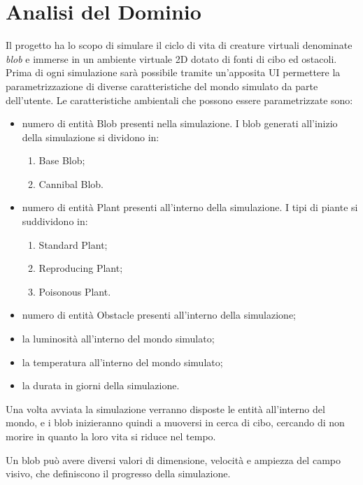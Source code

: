 \chapter{Analisi del Dominio}

Il progetto ha lo scopo di simulare il ciclo di vita di creature virtuali denominate \textit{blob} e immerse in un ambiente virtuale 2D dotato di fonti di cibo ed ostacoli.
Prima di ogni simulazione sarà possibile tramite un'apposita UI permettere la parametrizzazione di diverse caratteristiche del mondo simulato da parte dell'utente.
Le caratteristiche ambientali che possono essere parametrizzate sono:
\begin{itemize}
    \item numero di entità Blob presenti nella simulazione. I blob generati all'inizio della simulazione si dividono in:
    \begin{enumerate}
        \item Base Blob;
        \item Cannibal Blob.
    \end{enumerate}
    \item numero di entità Plant presenti all'interno della simulazione. I tipi di piante si suddividono in:
    \begin{enumerate}
        \item Standard Plant;
        \item Reproducing Plant;
        \item Poisonous Plant.
    \end{enumerate}
    \item numero di entità Obstacle presenti all'interno della simulazione;
    \item la luminosità all'interno del mondo simulato;
    \item la temperatura all'interno del mondo simulato;
    \item la durata in giorni della simulazione.
\end{itemize}

Una volta avviata la simulazione verranno disposte le entità all'interno del mondo, e i blob inizieranno quindi a muoversi in cerca di cibo, cercando di non morire in quanto la loro vita si riduce nel tempo. 

Un blob può avere diversi valori di dimensione, velocità e ampiezza del campo visivo, che definiscono il progresso della simulazione.

